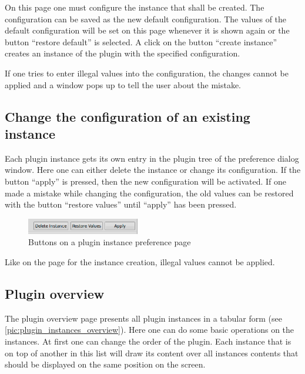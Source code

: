 On this page one must configure the instance that shall be created. The configuration can be saved as the new default
configuration. The values of the default configuration will be set on this page whenever it is shown again or the button
``restore default'' is selected. A click on the button ``create instance'' creates an instance of the plugin with the
specified configuration.

If one tries to enter illegal values into the configuration, the changes cannot be applied and a window pops up to tell the
user about the mistake.

\subsection{Change the configuration of an existing instance}

Each plugin instance gets its own entry in the plugin tree of the preference dialog window. Here one can either delete
the instance or change its configuration. If the button ``apply'' is pressed, then the new configuration will be
activated. If one made a mistake while changing the configuration, the old values can be restored with the button
``restore values'' until ``apply'' has been pressed.

\begin{figure}[htb]
  \begin{center}
    \includegraphics[width=5cm]{./pics/buttons_instance_configuration}
    \caption{Buttons on a plugin instance preference page}
    \label{pic:buttons_instance_configuration}
  \end{center}
\end{figure}

Like on the page for the instance creation, illegal values cannot be applied.


\subsection{Plugin overview}
\label{subsection:pluginoverview}

The plugin overview page presents all plugin instances in a tabular form (see \ref{pic:plugin_instances_overview}).
Here one can do some basic operations
on the instances. At first one can change the order of the plugin. Each instance that is on top of another in this list will
draw its content over all instances contents that should be displayed on the same position on the screen.

